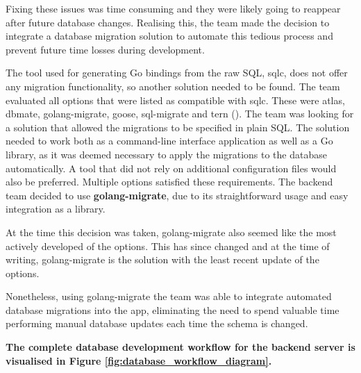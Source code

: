 Fixing these issues was time consuming and they were likely going to reappear
after future database changes. Realising this, the team made the decision to
integrate a database migration solution to automate this tedious process and
prevent future time losses during development.

The tool used for generating Go bindings from the raw SQL, sqlc, does not offer
any migration functionality, so another solution needed to be found. The team
evaluated all options that were listed as compatible with sqlc. These were
atlas, dbmate, golang-migrate, goose, sql-migrate and tern
(\cite{sqlc_updating_database_schema}). The team was looking for a solution that
allowed the migrations to be specified in plain SQL. The solution needed to work
both as a command-line interface application as well as a Go library, as it was
deemed necessary to apply the migrations to the database automatically. A tool
that did not rely on additional configuration files would also be preferred.
Multiple options satisfied these requirements. The backend team decided to use
\textbf{golang-migrate}, due to its straightforward usage and easy integration as a
library.

At the time this decision was taken, golang-migrate also seemed like
the most actively developed of the options. This has since changed and at the
time of writing, golang-migrate is the solution with the least recent update of
the options.

Nonetheless, using golang-migrate the team was able to integrate automated
database migrations into the app, eliminating the need to spend valuable time
performing manual database updates each time the schema is changed.

\textbf{The complete database development workflow for the backend server is visualised
in Figure \ref{fig:database_workflow_diagram}.}

